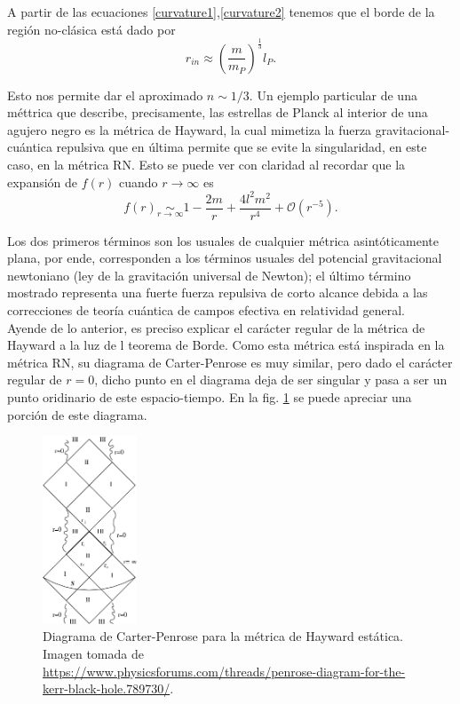 \documentclass[16pt,a4paper]{article}
\numberwithin{equation}{section}
\theoremstyle{definition}
\begin{document}
A partir de las ecuaciones \eqref{curvature1},\eqref{curvature2} tenemos que el borde de la región no-clásica está dado por
\begin{equation*}
r_{in} \approx \left(\frac{m}{m_P}\right)^{\frac{1}{3}}l_P.
\end{equation*}

Esto nos permite dar el aproximado $n \sim 1/3$. Un ejemplo particular de una méttrica que describe, precisamente, las estrellas de Planck al interior de una agujero negro es la métrica de Hayward, la cual mimetiza la fuerza gravitacional-cuántica repulsiva que en última permite que se evite la singularidad, en este caso, en la métrica RN. Esto se puede ver con claridad al recordar que la expansión de $f(r)$ cuando $r \to \infty$ es
\begin{equation*}
f(r) \underset{r \to \infty}{\sim} 1 - \frac{2m}{r} + \frac{4l^2m^2}{r^4} + \mathcal{O}(r^{-5}).
\end{equation*}

Los dos primeros términos son los usuales de cualquier métrica asintóticamente plana, por ende, corresponden a los términos usuales del potencial gravitacional newtoniano (ley de la gravitación universal de Newton); el último término mostrado representa una fuerte fuerza repulsiva de corto alcance debida a las correcciones de teoría cuántica de campos efectiva en relatividad general.\\

Ayende de lo anterior, es preciso explicar el carácter regular de la métrica de Hayward a la luz de l teorema de Borde. Como esta métrica está inspirada en la métrica RN, su diagrama de Carter-Penrose es muy similar, pero dado el carácter regular de $r = 0$, dicho punto en el diagrama deja de ser singular y pasa a ser un punto oridinario de este espacio-tiempo. En la fig. \ref{fig: carter penrose diagram hayward} se puede apreciar una porción de este diagrama.\\
\begin{figure}[h!]
	\centering
	\includegraphics[width=0.25\textwidth,height=0.34\textheight]{CPDhayward}
	\caption{Diagrama de Carter-Penrose para la métrica de Hayward estática. Imagen tomada de \url{https://www.physicsforums.com/threads/penrose-diagram-for-the-kerr-black-hole.789730/}.}
	\label{fig: carter penrose diagram hayward}
\end{figure}
\end{document}
